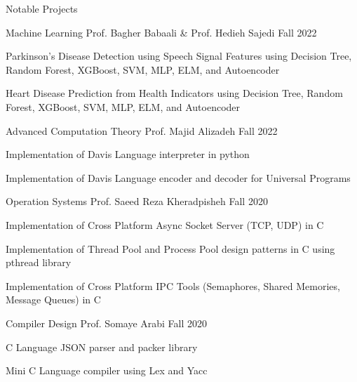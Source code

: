 \documentclass[]{main}
\begin{document}
\begin{section}{Notable Projects}
\begin{subsection}{ Machine Learning }{ Prof. Bagher Babaali \& Prof. Hedieh Sajedi }{ Fall 2022 }{  }
            \item Parkinson's Disease Detection using Speech Signal Features using Decision Tree, Random Forest, XGBoost, SVM, MLP, ELM, and Autoencoder \;\href{ https://github.com/ckoliber/mlexercises/blob/master/src/exercise2_1.ipynb }{\faExternalLink*}
            \item Heart Disease Prediction from Health Indicators using Decision Tree, Random Forest, XGBoost, SVM, MLP, ELM, and Autoencoder \;\href{ https://github.com/ckoliber/mlexercises/blob/master/src/project.ipynb }{\faExternalLink*}
            \end{subsection}
    \begin{subsection}{ Advanced Computation Theory }{ Prof. Majid Alizadeh }{ Fall 2022 }{  }
            \item Implementation of Davis Language interpreter in python \;\href{ https://github.com/ckoliber/actexercises/blob/master/projects/interpreter.py }{\faExternalLink*}
            \item Implementation of Davis Language encoder and decoder for Universal Programs \;\href{ https://github.com/ckoliber/actexercises/blob/master/projects/encoder.py }{\faExternalLink*}
            \end{subsection}
    \begin{subsection}{ Operation Systems }{ Prof. Saeed Reza Kheradpisheh }{ Fall 2020 }{  }
            \item Implementation of Cross Platform Async Socket Server (TCP, UDP) in C \;\href{ https://github.com/ckoliber/Knet }{\faExternalLink*}
            \item Implementation of Thread Pool and Process Pool design patterns in C using pthread library \;\href{ https://github.com/ckoliber/Kprocessor }{\faExternalLink*}
            \item Implementation of Cross Platform IPC Tools (Semaphores, Shared Memories, Message Queues) in C \;\href{ https://github.com/ckoliber/Kipc }{\faExternalLink*}
            \end{subsection}
    \begin{subsection}{ Compiler Design }{ Prof. Somaye Arabi }{ Fall 2020 }{  }
            \item C Language JSON parser and packer library \;\href{ https://github.com/ckoliber/Kson }{\faExternalLink*}
            \item Mini C Language compiler using Lex and Yacc \;\href{ https://github.com/ckoliber/minicc }{\faExternalLink*}
            \end{subsection}

\end{section}
\end{document}
